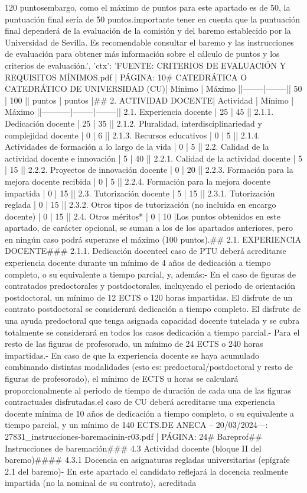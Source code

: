 \documentclass{article}
\begin{document}
\begin{itemize}
{{120 puntos\n\nSin embargo, como el máximo de puntos para este apartado es de 50, la puntuación final sería de 50 puntos.\n\nEs importante tener en cuenta que la puntuación final dependerá de la evaluación de la comisión y del baremo establecido por la Universidad de Sevilla. Es recomendable consultar el baremo y las instrucciones de evaluación para obtener más información sobre el cálculo de puntos y los criterios de evaluación.', 'ctx': 'FUENTE: CRITERIOS DE EVALUACIÓN Y REQUISITOS MÍNIMOS.pdf | PÁGINA: 10\n# CATEDRÁTICA O CATEDRÁTICO DE UNIVERSIDAD (CU)\n\n| Mínimo | Máximo |\n|--------|--------|\n| 50     | 100    |\n| puntos | puntos |\n\n## 2. ACTIVIDAD DOCENTE\n\n| Actividad | Mínimo | Máximo |\n|-----------|--------|--------|\n| 2.1. Experiencia docente | 25 | 45 |\n| 2.1.1. Dedicación docente | 25 | 35 |\n| 2.1.2. Pluralidad, interdisciplinariedad y complejidad docente | 0 | 6 |\n| 2.1.3. Recursos educativos | 0 | 5 |\n| 2.1.4. Actividades de formación a lo largo de la vida | 0 | 5 |\n| 2.2. Calidad de la actividad docente e innovación | 5 | 40 |\n| 2.2.1. Calidad de la actividad docente | 5 | 15 |\n| 2.2.2. Proyectos de innovación docente | 0 | 20 |\n| 2.2.3. Formación para la mejora docente recibida | 0 | 5 |\n| 2.2.4. Formación para la mejora docente impartida | 0 | 15 |\n| 2.3. Tutorización docente | 5 | 15 |\n| 2.3.1. Tutorización reglada | 0 | 15 |\n| 2.3.2. Otros tipos de tutorización (no incluida en encargo docente) | 0 | 15 |\n| 2.4. Otros méritos* | 0 | 10 |\n\n* Los puntos obtenidos en este apartado, de carácter opcional, se suman a los de los apartados anteriores, pero en ningún caso podrá superarse el máximo (100 puntos).\n\n## 2.1. EXPERIENCIA DOCENTE\n\n### 2.1.1. Dedicación docente\n\nEn el caso de PTU deberá acreditarse experiencia docente durante un mínimo de 4 años de dedicación a tiempo completo, o su equivalente a tiempo parcial, y, además:\n\n- En el caso de figuras de contratados predoctorales y postdoctorales, incluyendo el periodo de orientación postdoctoral, un mínimo de 12 ECTS o 120 horas impartidas. El disfrute de un contrato postdoctoral se considerará dedicación a tiempo completo. El disfrute de una ayuda predoctoral que tenga asignada capacidad docente tutelada y se cubra totalmente se considerará en todos los casos dedicación a tiempo parcial.\n\n- Para el resto de las figuras de profesorado, un mínimo de 24 ECTS o 240 horas impartidas.\n\n- En caso de que la experiencia docente se haya acumulado combinando distintas modalidades (esto es: predoctoral/postdoctoral y resto de figuras de profesorado), el mínimo de ECTS u horas se calculará proporcionalmente al periodo de tiempo de duración de cada una de las figuras contractuales disfrutadas.\n\nEn el caso de CU deberá acreditarse una experiencia docente mínima de 10 años de dedicación a tiempo completo, o su equivalente a tiempo parcial, y un mínimo de 140 ECTS.\n{} DE ANECA – 20/03/2024\n\n---\n\nFUENTE: 27831_instrucciones-baremacinin-r03.pdf | PÁGINA: 24\n# Bareprof\n## Instrucciones de baremación\n\n### 4.3 Actividad docente (bloque II del baremo)\n\n#### 4.3.1 Docencia en asignaturas regladas universitarias (epígrafe 2.1 del baremo)\n\n- En este apartado el candidato reflejará la docencia realmente impartida (no la nominal de su contrato), acreditada }}
\end{itemize}
\end{document}
